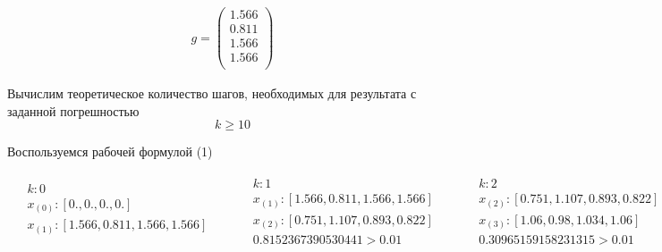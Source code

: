 \documentclass[letterpaper, 11pt]{extarticle}
\begin{document}
\begin{align*}
    g = \begin{pmatrix}
        1.566 \\
        0.811 \\
        1.566 \\
        1.566 \\
    \end{pmatrix}
\end{align*}

\noindent Вычислим теоретическое количество шагов, необходимых для результата с заданной 
погрешностью
\begin{equation*}
    k \geq 10
\end{equation*}

\noindent Воспользуемся рабочей формулой (1)

\begin{align*}
    \begin{aligned}
        & k: 0 \\
        & x_{(0)}: [0., 0., 0., 0.] \\
        & x_{(1)}: [1.566, 0.811, 1.566, 1.566] \\
    \end{aligned}
    \qquad
    \begin{aligned}
        & k: 1 \\
        & x_{(1)}: [1.566, 0.811, 1.566, 1.566] \\ 
        & x_{(2)}: [0.751, 1.107, 0.893, 0.822] \\
        & 0.8152367390530441 > 0.01
    \end{aligned}
    \qquad
    \begin{aligned}
        & k: 2 \\
        & x_{(2)}: [0.751, 1.107, 0.893, 0.822] \\
        & x_{(3)}: [1.06,  0.98,  1.034, 1.06 ] \\
        & 0.30965159158231315 > 0.01
    \end{aligned}
\end{align*}
\end{document}
